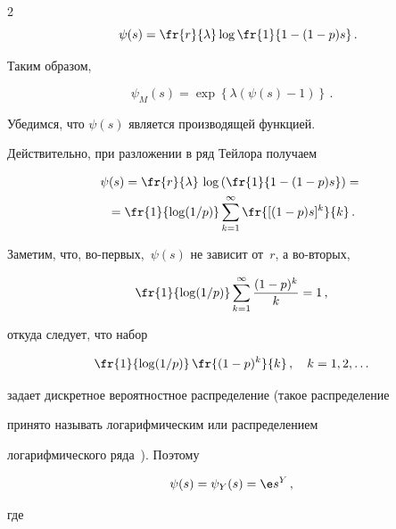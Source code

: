 \begin{multicols}{2}
\begin{equation}
\quad


\psi(s)=\fr{r}{\lambda}\log\fr{1}{1-(1-p)s}\,.


\label{Tuu03}


\end{equation}


Таким образом,


$$


\psi_{M}(s)=\exp\left\{\lambda(\psi(s)-1)\right\}\,.


$$


Убедимся, что $\psi(s)$ является производящей функцией.


Действительно, при разложении в ряд Тейлора получаем


\begin{multline*}


\psi(s)=\fr{r}{\lambda}\,\log\left(\fr{1}{1-(1-p)s}\right)={}\\


{}=


\fr{1}{\log(1/p)}\sum\limits_{k=1}^\infty


\fr{[(1-p)s]^k}{k}\,.


\end{multline*}


Заметим, что, во-первых,~$\psi(s)$ не зависит от~$r$, а во-вторых,


$$


\fr{1}{\log(1/p)}\sum\limits_{k=1}^\infty\frac{(1-p)^k}{k}=1\,,


$$


откуда следует, что набор


$$


\fr{1}{\log(1/p)}\,\fr{(1-p)^k}{k}\,, \quad


k=1,2,\ldots


$$


задает дискретное вероятностное распределение (такое распределение


принято называть логарифмическим или распределением


логарифмического ряда~\cite{11g, 12g}). Поэтому


\begin{equation} 


\psi(s)=\psi_{Y}(s)=\e s^Y\,,


\label{Tu104}


\end{equation}


где


\begin{equation*}



\end{equation*}
\end{multicols}
